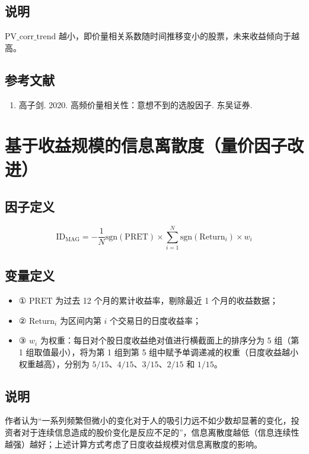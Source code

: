 \documentclass{article}
\begin{document}
\subsection{说明}
\( \mathrm{PV\_corr\_trend} \) 越小，即价量相关系数随时间推移变小的股票，未来收益倾向于越高。

\subsection{参考文献}
\begin{enumerate}
    \item 高子剑. 2020. 高频价量相关性：意想不到的选股因子. 东吴证券.
\end{enumerate}

\section{基于收益规模的信息离散度（量价因子改进）}

\subsection{因子定义}
\begin{equation}
    \mathrm{ID_{MAG}} = -\frac{1}{N} \mathrm{sgn}(\mathrm{PRET}) \times \sum_{i=1}^{N} \mathrm{sgn}(\mathrm{Return}_i) \times w_i
\end{equation}

\subsection{变量定义}
\begin{itemize}
    \item ① \( \mathrm{PRET} \) 为过去 12 个月的累计收益率，剔除最近 1 个月的收益数据；
    \item ② \( \mathrm{Return}_i \) 为区间内第 \( i \) 个交易日的日度收益率；
    \item ③ \( w_i \) 为权重：每日对个股日度收益绝对值进行横截面上的排序分为 5 组（第 1 组取值最小），将为第 1 组到第 5 组中赋予单调递减的权重（日度收益越小权重越高），分别为 \( 5/15 \)、\( 4/15 \)、\( 3/15 \)、\( 2/15 \) 和 \( 1/15 \)。
\end{itemize}

\subsection{说明}
作者认为“一系列频繁但微小的变化对于人的吸引力远不如少数却显著的变化，投资者对于连续信息造成的股价变化是反应不足的”，信息离散度越低（信息连续性越强）越好；上述计算方式考虑了日度收益规模对信息离散度的影响。
\end{document}
